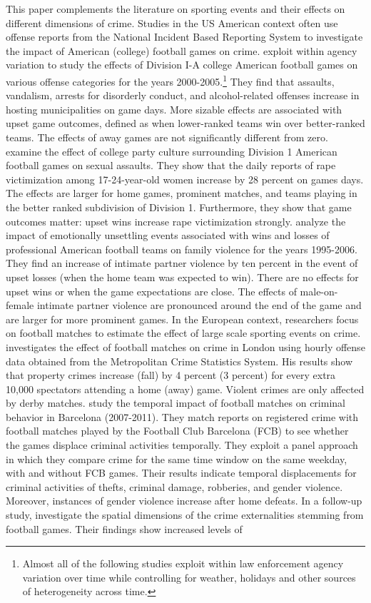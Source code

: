 This paper complements the literature on sporting events and their effects on different dimensions of crime. Studies in the US American context often use offense reports from the National Incident Based Reporting System to investigate the impact of American (college) football games on crime. \cite{rees2009college} exploit within agency variation to study the effects of Division I-A college American football games on various offense categories for the years 2000-2005.\footnote{Almost all of the following studies exploit within law enforcement agency variation over time while controlling for weather, holidays and other sources of heterogeneity across time.} They find that assaults, vandalism, arrests for disorderly conduct, and alcohol-related offenses increase in hosting municipalities on game days. More sizable effects are associated with upset game outcomes, defined as when lower-ranked teams win over better-ranked teams. The effects of away games are not significantly different from zero. \cite{lindo2018college} examine the effect of college party culture surrounding Division 1 American football games on sexual assaults. They show that the daily reports of rape victimization among 17-24-year-old women increase by 28 percent on games days. The effects are larger for home games, prominent matches, and teams playing in the better ranked subdivision of Division 1. Furthermore, they show that game outcomes matter: upset wins increase rape victimization strongly. \cite{card2011family} analyze the impact of emotionally unsettling events associated with wins and losses of professional American football teams on family violence for the years 1995-2006. They find an increase of intimate partner violence by ten percent in the event of upset losses (when the home team was expected to win). There are no effects for upset wins or when the game expectations are close. The effects of male-on-female intimate partner violence are pronounced around the end of the game and are larger for more prominent games. In the European context, researchers focus on football matches to estimate the effect of large scale sporting events on crime. \cite{marie2016police} investigates the effect of football matches on crime in London using hourly offense data obtained from the Metropolitan Crime Statistics System. His results show that property crimes increase (fall) by 4 percent (3 percent) for every extra 10,000 spectators attending a home (away) game. Violent crimes are only affected by derby matches. \cite{montolio2016time} study the temporal impact of football matches on criminal behavior in Barcelona (2007-2011). They match reports on registered crime with football matches played by the Football Club Barcelona (FCB) to see whether the games displace criminal activities temporally. They exploit a panel approach in which they compare crime for the same time window on the same weekday, with and without FCB games. Their results indicate temporal displacements for criminal activities of thefts, criminal damage, robberies, and gender violence. Moreover, instances of gender violence increase after home defeats. In a follow-up study, \cite{montolio2019measuring} investigate the spatial dimensions of the crime externalities stemming from football games. Their findings show increased levels of 